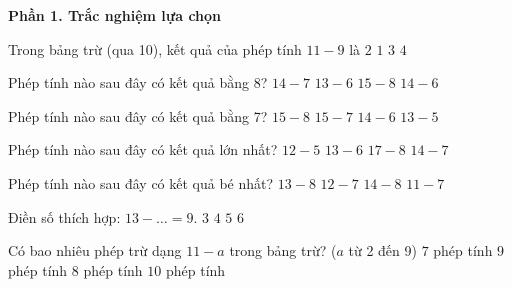 \textbf{Phần 1. Trắc nghiệm lựa chọn}

\begin{ex} %
Trong bảng trừ (qua 10), kết quả của phép tính $11 - 9$ là
\choice
{\True $2$}
{$1$}
{$3$}
{$4$}
\end{ex}

\begin{ex} %
Phép tính nào sau đây có kết quả bằng 8?
\choice
{$14 - 7$}
{$13 - 6$}
{$15 - 8$}
{\True $14 - 6$}
\end{ex}

\begin{ex} %
Phép tính nào sau đây có kết quả bằng 7?
\choice
{\True $15 - 8$}
{$15 - 7$}
{$14 - 6$}
{$13 - 5$}
\end{ex}

\begin{ex} %
Phép tính nào sau đây có kết quả lớn nhất?
\choice
{$12 - 5$}
{$13 - 6$}
{\True $17 - 8$}
{$14 - 7$}
\end{ex}

\begin{ex} %
Phép tính nào sau đây có kết quả bé nhất?
\choice
{$13 - 8$}
{$12 - 7$}
{$14 - 8$}
{\True $11 - 7$}
\end{ex}

\begin{ex} %
Điền số thích hợp: $13 - \dots = 9$.
\choice
{$3$}
{\True $4$}
{$5$}
{$6$}
\end{ex}

\begin{ex} %
Có bao nhiêu phép trừ dạng $11 - a$ trong bảng trừ? ($a$ từ 2 đến 9)
\choice
{$7$ phép tính}
{$9$ phép tính}
{\True $8$ phép tính}
{$10$ phép tính}
\end{ex}

